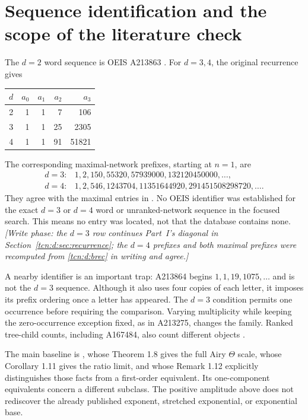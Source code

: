 \documentclass[11pt,letterpaper]{article}
\theoremstyle{remark}
\begin{document}
\section{Sequence identification and the scope of the literature check}\label{tcn:f:sec:literature}
The $d=2$ word sequence is OEIS A213863 \cite{OEIS}. For $d=3,4$, the original recurrence gives
\begin{center}
\begin{tabular}{crrrr}
\toprule
$d$ & $a_0$ & $a_1$ & $a_2$ & $a_3$\\
\midrule
2 & 1 & 1 & 7 & 106\\
3 & 1 & 1 & 25 & 2305\\
4 & 1 & 1 & 91 & 51821\\
\bottomrule
\end{tabular}
\end{center}
The corresponding maximal-network prefixes, starting at $n=1$, are
\[
\begin{array}{ll}
 d=3:&1,2,150,55320,57939000,132120450000,\ldots,\\
 d=4:&1,2,546,1243704,11351644920,291451508298720,\ldots.
\end{array}
\]
They agree with the maximal entries in \cite[Appendix A, Tables 3--4]{Chang2024}. No OEIS identifier was established for the exact $d=3$ or $d=4$ word or unranked-network sequence in the focused search. This means no entry was located, not that the database contains none. \emph{[Write phase: the $d=3$ row continues Part~I's diagonal in Section~\ref{tcn:d:sec:recurrence}; the $d=4$ prefixes and both maximal prefixes were recomputed from \eqref{tcn:d:brec} in writing and agree.]}

A nearby identifier is an important trap: A213864 begins $1,1,19,1075,\ldots$ and is not the $d=3$ sequence. Although it also uses four copies of each letter, it imposes its prefix ordering once a letter has appeared. The $d=3$ condition permits one occurrence before requiring the comparison. Varying multiplicity while keeping the zero-occurrence exception fixed, as in A213275, changes the family. Ranked tree-child counts, including A167484, also count different objects \cite{OEIS213864,OEIS213275,OEIS167484}.

The main baseline is \cite{Chang2024}, whose Theorem 1.8 gives the full Airy $\Theta$ scale, whose Corollary 1.11 gives the ratio limit, and whose Remark 1.12 explicitly distinguishes those facts from a first-order equivalent. Its one-component equivalents concern a different subclass. The positive amplitude above does not rediscover the already published exponent, stretched exponential, or exponential base.
\end{document}
